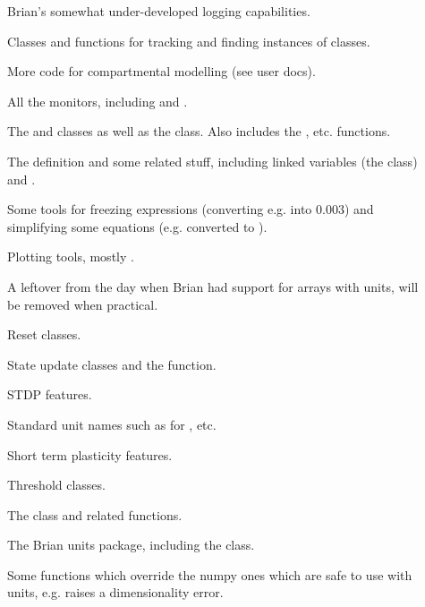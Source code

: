 \documentclass[letterpaper,10pt,english]{manual}
\begin{document}
\begin{description}
\item[]
Brian's somewhat under-developed logging capabilities.

\item[]
Classes and functions for tracking and finding instances of classes.

\item[]
More code for compartmental modelling (see user docs).

\item[]
All the monitors, including  and .

\item[]
The  and  classes as well as the
 class. Also includes the , etc.
functions.

\item[]
The  definition and some related stuff, including linked
variables (the  class) and .

\item[]
Some tools for freezing expressions (converting e.g.  into 0.003) and
simplifying some equations (e.g.  converted to ).

\item[]
Plotting tools, mostly .

\item[]
A leftover from the day when Brian had support for arrays with units, will
be removed when practical.

\item[]
Reset classes.

\item[]
State update classes and the  function.

\item[]
STDP features.

\item[]
Standard unit names such as  for , etc.

\item[]
Short term plasticity features.

\item[]
Threshold classes.

\item[]
The  class and related functions.

\item[]
The Brian units package, including the  class.

\item[]
Some functions which override the numpy ones which are safe to use with
units, e.g.  raises a dimensionality error.

\end{description}
\end{document}
